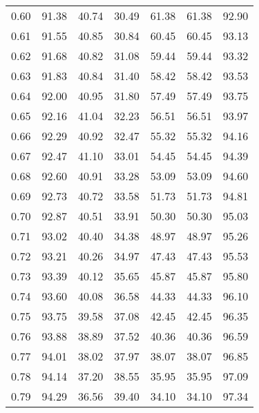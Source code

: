 \begin{tabular}{|c|c|c|c|c|c|c|}
      0.60 &     91.38 &     40.74 &      30.49 &   61.38 &      61.38 &         92.90 \\
      0.61 &     91.55 &     40.85 &      30.84 &   60.45 &      60.45 &         93.13 \\
      0.62 &     91.68 &     40.82 &      31.08 &   59.44 &      59.44 &         93.32 \\
      0.63 &     91.83 &     40.84 &      31.40 &   58.42 &      58.42 &         93.53 \\
      0.64 &     92.00 &     40.95 &      31.80 &   57.49 &      57.49 &         93.75 \\
      0.65 &     92.16 &     41.04 &      32.23 &   56.51 &      56.51 &         93.97 \\
      0.66 &     92.29 &     40.92 &      32.47 &   55.32 &      55.32 &         94.16 \\
      0.67 &     92.47 &     41.10 &      33.01 &   54.45 &      54.45 &         94.39 \\
      0.68 &     92.60 &     40.91 &      33.28 &   53.09 &      53.09 &         94.60 \\
      0.69 &     92.73 &     40.72 &      33.58 &   51.73 &      51.73 &         94.81 \\
      0.70 &     92.87 &     40.51 &      33.91 &   50.30 &      50.30 &         95.03 \\
      0.71 &     93.02 &     40.40 &      34.38 &   48.97 &      48.97 &         95.26 \\
      0.72 &     93.21 &     40.26 &      34.97 &   47.43 &      47.43 &         95.53 \\
      0.73 &     93.39 &     40.12 &      35.65 &   45.87 &      45.87 &         95.80 \\
      0.74 &     93.60 &     40.08 &      36.58 &   44.33 &      44.33 &         96.10 \\
      0.75 &     93.75 &     39.58 &      37.08 &   42.45 &      42.45 &         96.35 \\
      0.76 &     93.88 &     38.89 &      37.52 &   40.36 &      40.36 &         96.59 \\
      0.77 &     94.01 &     38.02 &      37.97 &   38.07 &      38.07 &         96.85 \\
      0.78 &     94.14 &     37.20 &      38.55 &   35.95 &      35.95 &         97.09 \\
      0.79 &     94.29 &     36.56 &      39.40 &   34.10 &      34.10 &         97.34 \\

\end{tabular}

